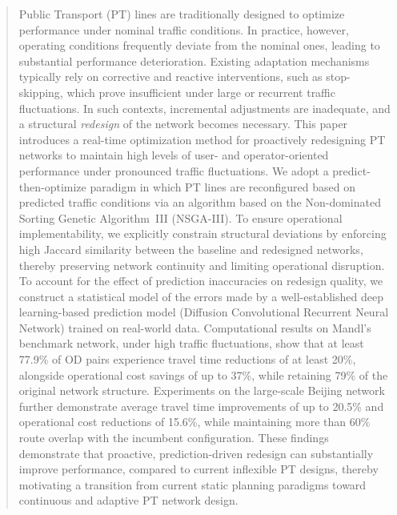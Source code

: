 \documentclass[a4paper,fleqn]{cas-sc}
\begin{document}
\fntext[1]{}


\begin{abstract}
Public Transport (PT) lines are traditionally designed to optimize performance under nominal traffic conditions. In practice, however, operating conditions frequently deviate from the nominal ones, leading to substantial performance deterioration. Existing adaptation mechanisms typically rely on corrective and reactive interventions, such as stop-skipping, which prove insufficient under large or recurrent traffic fluctuations. In such contexts, incremental adjustments are inadequate, and a structural \emph{redesign} of the network becomes necessary.
%
This paper introduces a real-time optimization method for proactively redesigning PT networks to maintain high levels of user- and operator-oriented performance under pronounced traffic fluctuations. We adopt a predict-then-optimize paradigm in which PT lines are reconfigured based on predicted traffic conditions via an algorithm based on the Non-dominated Sorting Genetic Algorithm~III (NSGA-III).
%
To ensure operational implementability, we explicitly constrain structural deviations by enforcing high Jaccard similarity between the baseline and redesigned networks, thereby preserving network continuity and limiting operational disruption. To account for the effect of prediction inaccuracies on redesign quality, we construct a statistical model of the errors made by a well-established deep learning-based prediction model (Diffusion Convolutional Recurrent Neural Network) trained on real-world data.
%
Computational results on Mandl's benchmark network, under high traffic fluctuations, show that at least 77.9\% of OD pairs experience travel time reductions of at least 20\%, alongside operational cost savings of up to 37\%, while retaining 79\% of the original network structure. Experiments on the large-scale Beijing network further demonstrate average travel time improvements of up to 20.5\% and operational cost reductions of 15.6\%, while maintaining more than 60\% route overlap with the incumbent configuration.
%
These findings demonstrate that proactive, prediction-driven redesign can substantially improve performance, compared to current inflexible PT designs, thereby motivating a transition from current static planning paradigms toward continuous and adaptive PT network design.
\end{abstract}
\end{document}
